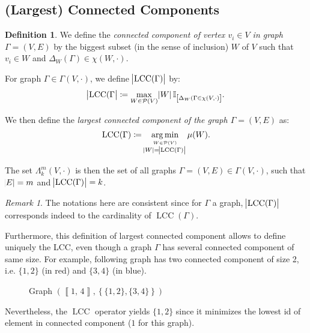 \documentclass{article}
\theoremstyle{definition}
\newtheorem{definition}[lemma]{Definition}
\theoremstyle{remark}
\newtheorem*{remark}{Remark}
\DeclareMathOperator{\LCC}{LCC}
\DeclareMathOperator*{\argmin}{arg\,min}
\newcommand{\intint}[2]{\left\llbracket#1, \, #2\right\rrbracket}
\begin{document}
	\subsection{(Largest) Connected Components}
		\begin{definition} We define the \textit{connected component of vertex $v_i \in V$ in graph $\Gamma = (V, E)$} by the biggest subset (in the sense of inclusion) $W$
		of $V$ such that $v_i \in W$ and $\Delta_W(\Gamma) \in \chi(W, \cdot)$.

		For graph $\Gamma \in \Gamma(V, \cdot)$, we define $\abs {\LCC(\Gamma)}$ by:
		\[\abs {\LCC(\Gamma} \coloneqq \max_{W \in \mathcal P(V)}\abs W\mathbb I_{\left[\Delta_W(\Gamma \in \chi(V, \cdot)\right]}.\]

		We then define the \textit{largest connected component of the graph $\Gamma = (V, E)$} as:
		\[\LCC(\Gamma) \coloneqq \argmin_{\stackrel {W \in \mathcal P(V)}{\abs W = \abs {\LCC(\Gamma)}}} \mu(W).\]

		The set $\Lambda_k^m(V, \cdot)$ is then the set of all graphs $\Gamma = (V, E) \in \Gamma(V, \cdot)$, such that $\abs E = m$ and $\abs {\LCC(\Gamma)} = k$.
		\end{definition}

		\begin{remark} The notations here are consistent since for $\Gamma$ a graph, $\abs {\LCC(\Gamma)}$ corresponds indeed to the cardinality of $\LCC(\Gamma)$.

		Furthermore, this definition of largest connected component allows to define uniquely the LCC, even though a graph $\Gamma$ has several connected component
		of same size. For example, following graph has two connected component of size 2, i.e. $\{1, 2\}$ (in red) and $\{3, 4\}$ (in blue).

		\begin{figure}[H]
		\begin{center}
		\end{center}
		\caption{Graph $\left(\intint 14, \left\{\{1, 2\}, \{3, 4\}\right\}\right)$}
		\end{figure}

		Nevertheless, the $\LCC$ operator yields $\{1, 2\}$ since it minimizes the lowest id of element in connected component ($1$ for this graph).
		\end{remark}
\end{document}
